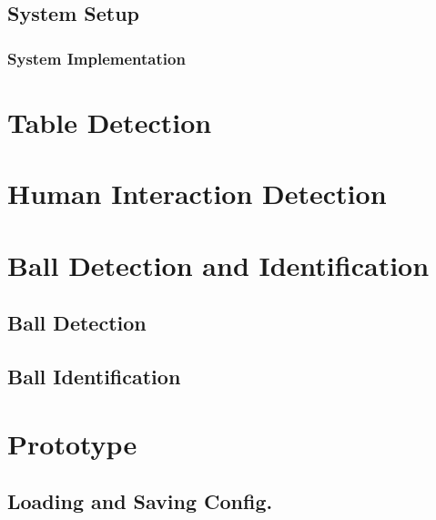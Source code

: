 		\section{System Setup}
			\label{sec:setup}
			
			
			\subsection{System Implementation}
				\label{sec:implementation}
				
		
	\chapter{Table Detection}
		\label{sec:table-locate}
			
		
		
	\chapter{Human Interaction Detection}
		\label{sec:shotdetection}
		

	\chapter{Ball Detection and Identification}
		\label{sec:balls-intro}	
			
		
			\section{Ball Detection}
				\label{sec:balls-locate}
				
		
			\section{Ball Identification}
				\label{sec:balls-id}
				
				
	\chapter{Prototype}
		
		
		\section{Loading and Saving Config.}
			\label{sec:loadsaveconfig}
					
		
